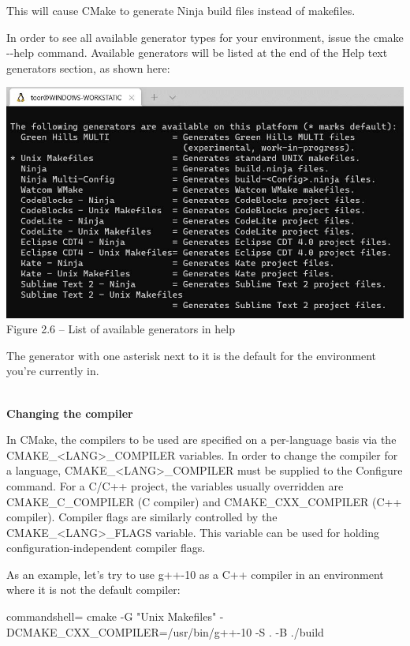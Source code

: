This will cause CMake to generate Ninja build files instead of makefiles.

In order to see all available generator types for your environment, issue the cmake -{}-help command. Available generators will be listed at the end of the Help text generators section, as shown here:

\begin{center}
\includegraphics[width=1.\textwidth]{content/1/chapter2/images/6.jpg}\\
Figure 2.6 – List of available generators in help
\end{center}

The generator with one asterisk next to it is the default for the environment you're currently in.

\hspace*{\fill} \\ %
\noindent
\textbf{Changing the compiler}

In CMake, the compilers to be used are specified on a per-language basis via the CMAKE\_<LANG>\_COMPILER variables. In order to change the compiler for a language, CMAKE\_<LANG>\_COMPILER must be supplied to the Configure command. For a C/C++ project, the variables usually overridden are CMAKE\_C\_COMPILER (C compiler) and CMAKE\_CXX\_COMPILER (C++ compiler). Compiler flags are similarly controlled by the CMAKE\_<LANG>\_FLAGS variable. This variable can be used for holding configuration-independent compiler flags.

As an example, let's try to use g++-10 as a C++ compiler in an environment where it is not the default compiler:

\begin{tcblisting}{commandshell={}}
cmake -G "Unix Makefiles" -DCMAKE_CXX_COMPILER=/usr/bin/g++-10 -S .  
  -B ./build
\end{tcblisting}


